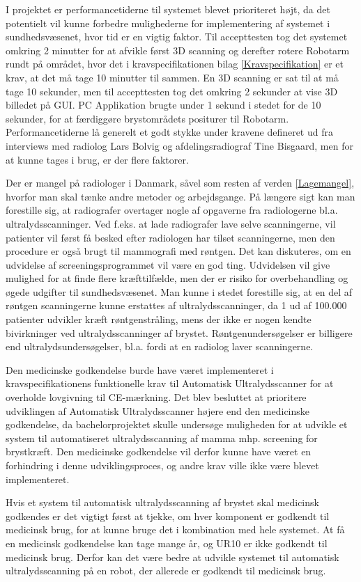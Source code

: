 I projektet er performancetiderne til systemet blevet prioriteret højt, da det potentielt vil kunne forbedre mulighederne for implementering af systemet i sundhedsvæsenet, hvor tid er en vigtig faktor. Til accepttesten tog det systemet omkring 2 minutter for at afvikle først 3D scanning og derefter rotere Robotarm rundt på området, hvor det i kravspecifikationen bilag \ref{Kravspecifikation} er et krav, at det må tage 10 minutter til sammen. En 3D scanning er sat til at må tage 10 sekunder, men til accepttesten tog det omkring 2 sekunder at vise 3D billedet på GUI. PC Applikation brugte under 1 sekund i stedet for de 10 sekunder, for at færdiggøre brystområdets positurer til Robotarm. Performancetiderne lå generelt et godt stykke under kravene defineret ud fra interviews med radiolog Lars Bolvig og afdelingsradiograf Tine Bisgaard, men for at kunne tages i brug, er der flere faktorer. 

Der er mangel på radiologer i Danmark, såvel som resten af verden \ref{Lagemangel}, hvorfor man skal tænke andre metoder og arbejdsgange. På længere sigt kan man forestille sig, at radiografer overtager nogle af opgaverne fra radiologerne bl.a. ultralydsscanninger. Ved f.eks. at lade radiografer lave selve scanningerne, vil patienter vil først få besked efter radiologen har tilset scanningerne, men den procedure er også brugt til mammografi med røntgen. Det kan diskuteres, om en udvidelse af screeningsprogrammet vil være en god ting. Udvidelsen vil give mulighed for at finde flere kræfttilfælde, men der er risiko for overbehandling og øgede udgifter til sundhedsvæsenet. Man kunne i stedet forestille sig, at en del af røntgen scanningerne kunne erstattes af ultralydsscanninger, da 1 ud af 100.000 patienter udvikler kræft røntgenstråling, mens der ikke er nogen kendte bivirkninger ved ultralydsscanninger af brystet. Røntgenundersøgelser er billigere end ultralydsundersøgelser, bl.a. fordi at en radiolog laver scanningerne. 

Den medicinske godkendelse burde have været implementeret i kravspecifikationens funktionelle krav til Automatisk Ultralydsscanner for at overholde lovgivning til CE-mærkning. Det blev besluttet at prioritere udviklingen af Automatisk Ultralydsscanner højere end den medicinske godkendelse, da bachelorprojektet skulle undersøge muligheden for at udvikle et system til automatiseret ultralydsscanning af mamma mhp. screening for brystkræft. Den medicinske godkendelse vil derfor kunne have været en forhindring i denne udviklingsproces, og andre krav ville ikke være blevet implementeret. 

Hvis et system til automatisk ultralydsscanning af brystet skal medicinsk godkendes er det vigtigt først at tjekke, om hver komponent er godkendt til medicinsk brug, for at kunne bruge det i kombination med hele systemet. At få en medicinsk godkendelse kan tage mange år, og UR10 er ikke godkendt til medicinsk brug. Derfor kan det være bedre at udvikle systemet til automatisk ultralydsscanning på en robot, der allerede er godkendt til medicinsk brug. 

